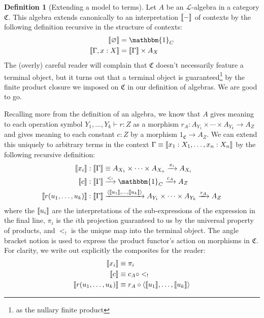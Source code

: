 \documentclass[12pt,twoside]{reedthesis}
\theoremstyle{definition}
\newtheorem{definition}{Definition}
\theoremstyle{remark}
\theoremstyle{plain}
\begin{document}
\DeclarePairedDelimiter{\sem}{\llbracket}{\rrbracket}

\begin{definition}[Extending a model to terms]\label{def:term model}
  Let $A$ be an $\mathcal{L}$-algebra in a category $\mathfrak{C}$. This algebra
  extends canonically to an interpretation $\sem{-}$ of contexts by the
  following definition recursive in the structure of contexts:
  \begin{align}
    \label{eq:contexts interp}
    \sem{\varnothing} &= \mathbbm{1}_{C} \\
    \sem{\Gamma, x : X} &= \sem{\Gamma} \times A_{X}
  \end{align}
  The (overly) careful reader will complain that $\mathfrak{C}$ doesn't
  necessarily feature a terminal object, but it turns out that a terminal object
  is guaranteed\footnote{as the nullary finite product} by the finite product
  closure we imposed on $\mathfrak{C}$ in our definition of algebras. We are
  good to go.

  Recalling more from the definition of an algebra, we know that $A$ gives
  meaning to each operation symbol \( Y_{1},\dots , Y_{k} \vdash r : Z \) as a
  morphism \( r_{A} : A_{Y_{1}} \times \cdots \times A_{Y_{k}} \rightarrow A_{Z} \) and gives meaning to
  each constant \( c : Z \) by a morphism \( 1_{\mathfrak{C}} \rightarrow A_{Z} \). We can
  extend this uniquely to arbitrary terms in the context
  \( \Gamma \equiv \sem{x_{1} : X_{1}, \dots , x_{n} : X_{n}} \) by the following
  recursive definition:
  \begin{align}
    \label{eq:term interp}
    \sem{x_{i}} &: \sem{\Gamma} \equiv A_{X_{1}} \times \cdots \times A_{X_{n}} \xrightarrow{\pi_{i}} A_{X_{i}} \\
    \sem{c} &: \sem{\Gamma} \xrightarrow{<_{!}} \mathbbm{1}_{C} \xrightarrow{c_{A}} A_{Z} \\
    \sem{r(u_{1}, \dots , u_{k})} &: \sem{\Gamma} \xrightarrow{\braket{\sem{u_{1}}, \dots, \sem{u_{k}}}} A_{Y_{1}} \times \cdots \times A_{Y_{k}} \xrightarrow{r_{A}} A_{Z}
  \end{align}
  where the $\sem{u_{i}}$ are the interpretations of the sub-expressions of the
  expression in the final line, $\pi_{i}$ is the $i$th projection guaranteed to us
  by the universal property of products, and $<_{!}$ is the unique map into the
  terminal object. The angle bracket notion is used to express the product
  functor's action on morphisms in $\mathfrak{C}$. For clarity, we write out
  explicitly the composites for the reader:
  \begin{align*}
    \sem{x_{i}} &\equiv \pi_{i} \\
    \sem{c} &\equiv c_{A } \circ <_{!} \\
    \sem{r(u_{1}, \dots , u_{k})} &\equiv r_{A} \circ \braket{\sem{u_{1}}, \dots,\sem{u_{k}}}
  \end{align*}
\end{definition}
\end{document}
